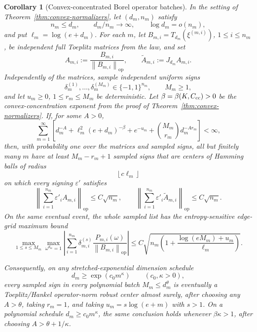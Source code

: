 \documentclass[11pt]{amsart}
\numberwithin{equation}{section}
\newtheorem{corollary}[theorem]{Corollary}
\theoremstyle{definition}
\theoremstyle{remark}
\newcommand{\op}{\mathrm{op}}
\newcommand{\norm}[1]{\left\lVert #1\right\rVert}
\newcommand{\eps}{\varepsilon}
\begin{document}
\begin{corollary}[Convex-concentrated Borel operator batches]
\label{cor:convex-normalizers-borel-operator-batches}
In the setting of Theorem~\ref{thm:convex-normalizers}, let
\((d_m,n_m)\) satisfy
\[
  n_m\le d_m,\qquad d_m/n_m\to\infty,\qquad \log d_m=o(n_m),
\]
and put \(\ell_m=\log(e+d_m)\).  For each \(m\), let
\(B_{m,i}=T_{d_m}(\xi^{(m,i)})\), \(1\le i\le n_m\), be independent full
Toeplitz matrices from the law, and set
\[
  A_{m,i}:=\frac{B_{m,i}}{\norm{B_{m,i}}_{\op}},
  \qquad
  \widetilde A_{m,i}:=J_{d_m}A_{m,i}.
\]
Independently of the matrices, sample independent uniform signs
\[
  \delta_m^{(1)},\ldots,\delta_m^{(M_m)}\in\{-1,1\}^{n_m},
  \qquad M_m\ge1,
\]
and let \(u_m\ge0\), \(1\le r_m\le M_m\) be deterministic.  Let
\(\beta=\beta(K,C_{\rm cc})>0\) be the convex-concentration exponent from the
proof of Theorem~\ref{thm:convex-normalizers}.  If, for some \(A>0\),
\[
  \sum_{m=1}^{\infty}
  \left[
    d_m^{-A}+\ell_m^2(e+d_m)^{-\beta}
    +e^{-u_m}+\binom{M_m}{r_m}d_m^{-A r_m}
  \right]<\infty ,
\]
then, with probability one over the matrices and sampled signs, all but
finitely many \(m\) have at least \(M_m-r_m+1\) sampled signs that are centers
of Hamming balls of radius
\[
  \left\lfloor c\ell_m\right\rfloor
\]
on which every signing \(\eps'\) satisfies
\[
  \left\|\sum_{i=1}^{n_m}\eps'_iA_{m,i}\right\|_{\op}
  \le C\sqrt{n_m},
  \qquad
  \left\|\sum_{i=1}^{n_m}\eps'_i\widetilde A_{m,i}\right\|_{\op}
  \le C\sqrt{n_m}.
\]
On the same eventual event, the whole sampled list has the entropy-sensitive
edge-grid maximum bound
\[
  \max_{1\le s\le M_m}\max_{\omega^{d_m}=1}
  \left|\sum_{i=1}^{n_m}\delta_{m,i}^{(s)}
  \frac{P_{m,i}(\omega)}{\norm{B_{m,i}}_{\op}}\right|
  \le
  C\sqrt{n_m\left(1+\frac{\log(eM_m)+u_m}{\ell_m}\right)} .
\]

Consequently, on any stretched-exponential dimension schedule
\[
  d_m\ge \exp(c_0m^\kappa)\qquad(c_0,\kappa>0),
\]
every sampled sign in every polynomial batch \(M_m\le d_m^\theta\) is
eventually a Toeplitz/Hankel operator-norm robust center almost surely, after
choosing any \(A>\theta\), taking \(r_m=1\), and taking
\(u_m=s\log(e+m)\) with \(s>1\).  On a polynomial schedule
\(d_m\ge c_0m^\kappa\), the same conclusion holds whenever
\(\beta\kappa>1\), after choosing \(A>\theta+1/\kappa\).
\end{corollary}
\end{document}

